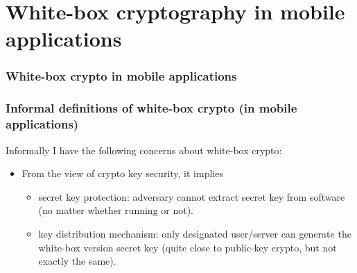\documentclass{beamer}
\begin{document}
\section{White-box cryptography in mobile applications}

\frame
{
\frametitle{White-box crypto in mobile applications}
\begin{center}
\end{center}

}

\frame
{
\frametitle{Informal definitions of white-box crypto (in mobile applications)}
Informally I have the following concerns about white-box crypto:
\begin{itemize}
\setlength{\itemsep}{12pt}
\item From the view of crypto key security, it implies
\begin{itemize}
\setlength{\itemsep}{12pt}
\item secret key protection: adversary cannot extract secret key from software (no matter whether running or not).

\item key distribution mechanism: only designated user/server can generate the white-box version secret key (quite close to public-key crypto, but not exactly the same).

\end{itemize}
\end{itemize}
}
\end{document}

